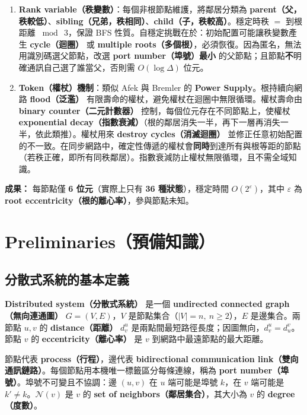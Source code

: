 \documentclass[a4paper, 12pt]{article}
\newcommand{\Neig}{\mathcal{N}}
\begin{document}
\begin{enumerate}
    \item \textbf{Rank variable（秩變數）}：每個非根節點維護，將鄰居分類為 \textbf{parent（父，秩較低）}、\textbf{sibling（兄弟，秩相同）}、\textbf{child（子，秩較高）}。穩定時秩 $=$ 到根距離 $\bmod\ 3$，保證 BFS 性質。自穩定挑戰在於：初始配置可能讓秩變數產生 \textbf{cycle（迴圈）} 或 \textbf{multiple roots（多個根）}，必須恢復。因為匿名，無法用識別碼選父節點，改選 \textbf{port number（埠號）最小} 的父節點；且節點\textbf{不}明確通訊自己選了誰當父，否則需 $O(\log\Delta)$ 位元。
    \item \textbf{Token（權杖）機制}：類似 Afek 與 Bremler 的 \textbf{Power Supply}。根持續向網路 \textbf{flood（泛濫）} 有限壽命的權杖，避免權杖在迴圈中無限循環。權杖壽命由 \textbf{binary counter（二元計數器）} 控制，每個位元存在不同節點上，使權杖 \textbf{exponential decay（指數衰減）}（根的鄰居消失一半，再下一層再消失一半，依此類推）。權杖用來 \textbf{destroy cycles（消滅迴圈）} 並修正任意初始配置的不一致。在同步網路中，確定性傳遞的權杖會\textbf{同時}到達所有與根等距的節點（若秩正確，即所有同秩鄰居）。指數衰減防止權杖無限循環，且不需全域知識。
\end{enumerate}

\textbf{成果：} 每節點僅 \textbf{6 位元}（實際上只有 \textbf{36 種狀態}），穩定時間 $O(2^{\varepsilon})$，其中 $\varepsilon$ 為 \textbf{root eccentricity（根的離心率）}，參與節點未知。

\section{Preliminaries（預備知識）}
\label{sec:preliminaries}

\subsection{分散式系統的基本定義}
\label{subsec:prelim-system}

\textbf{Distributed system（分散式系統）} 是一個 \textbf{undirected connected graph（無向連通圖）} $G=(V,E)$，$V$ 是節點集合（$|V|=n,\ n\ge 2$），$E$ 是邊集合。兩節點 $u,v$ 的 \textbf{distance（距離）} $d^u_v$ 是兩點間最短路徑長度；因圖無向，$d^u_v=d^v_u$。節點 $v$ 的 \textbf{eccentricity（離心率）} 是 $v$ 到網路中最遠節點的最大距離。

節點代表 \textbf{process（行程）}，邊代表 \textbf{bidirectional communication link（雙向通訊鏈路）}。每個節點用本機唯一標籤區分每條連線，稱為 \textbf{port number（埠號）}。埠號不可變且不協調：邊 $(u,v)$ 在 $u$ 端可能是埠號 $k$，在 $v$ 端可能是 $k'\neq k$。$\Neig(v)$ 是 $v$ 的 \textbf{set of neighbors（鄰居集合）}，其大小為 $v$ 的 \textbf{degree（度數）}。
\end{document}
